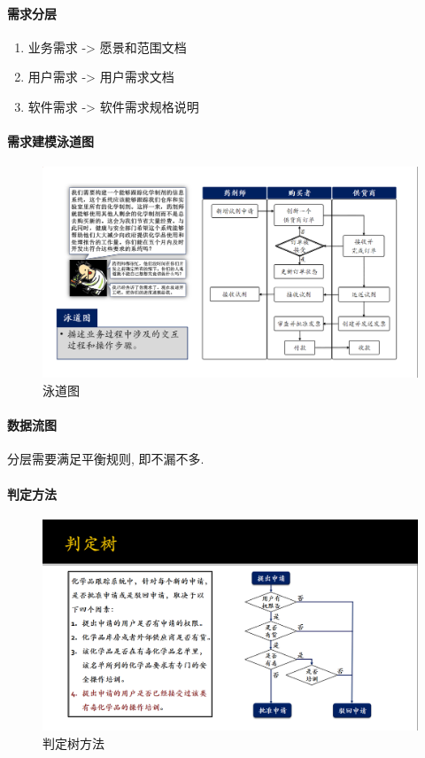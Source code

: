 \documentclass{ctexart}
\begin{document}
\paragraph{需求分层} \begin{enumerate}
        \item 业务需求 -> 愿景和范围文档
        \item 用户需求 -> 用户需求文档
        \item 软件需求 -> 软件需求规格说明
    \end{enumerate}
\paragraph{需求建模泳道图}
    \begin{figure}[ht!]
        \centering
        \includegraphics[width=\textwidth, height=\textheight, keepaspectratio]{lane.png}
        \caption{泳道图}
    \end{figure}
\paragraph{数据流图}
    分层需要满足平衡规则, 即不漏不多.
\paragraph{判定方法}
    \begin{figure}[ht!]
        \centering
        \includegraphics[width=\textwidth, height=\textheight, keepaspectratio]{pred-tree.png}
        \caption{判定树方法}
    \end{figure}
    
\end{document}
